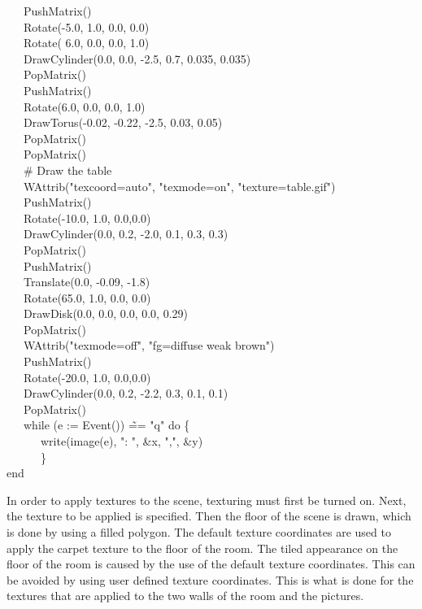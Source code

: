 \documentclass[letterpaper]{article}
\begin{document}
{{\ \ \ PushMatrix()\\
\ \ \ Rotate(-5.0, 1.0, 0.0, 0.0)\\
\ \ \ Rotate( 6.0, 0.0, 0.0, 1.0)\\
\ \ \ DrawCylinder(0.0, 0.0, -2.5, 0.7, 0.035, 0.035)\\
\ \ \ PopMatrix()\\
\ \ \ PushMatrix()\\
\ \ \ Rotate(6.0, 0.0, 0.0, 1.0)\\
\ \ \ DrawTorus(-0.02, -0.22, -2.5, 0.03, 0.05)\\
\ \ \ PopMatrix() \\
\ \ \ PopMatrix()\\
\ \ \ \# Draw the table \\
\ \ \ WAttrib("texcoord=auto", "texmode=on", "texture=table.gif")\\
\ \ \ PushMatrix()\\
\ \ \ Rotate(-10.0, 1.0, 0.0,0.0)\\
\ \ \ DrawCylinder(0.0, 0.2, -2.0, 0.1, 0.3, 0.3)\\
\ \ \ PopMatrix()\\
\ \ \ PushMatrix()\\
\ \ \ Translate(0.0, -0.09, -1.8)\\
\ \ \ Rotate(65.0, 1.0, 0.0, 0.0)\\
\ \ \ DrawDisk(0.0, 0.0, 0.0, 0.0, 0.29) \\
\ \ \ PopMatrix()\\
\ \ \ WAttrib("texmode=off", "fg=diffuse weak brown")\\
\ \ \ PushMatrix()\\
\ \ \ Rotate(-20.0, 1.0, 0.0,0.0)\\
\ \ \ DrawCylinder(0.0, 0.2, -2.2, 0.3, 0.1, 0.1)\\
\ \ \ PopMatrix()\\
\ \ \ while (e := Event()) \~== "q" do \{ \\
\ \ \ \ \ \ write(image(e), ": ", \&x, ",", \&y)\\
\ \ \ \ \ \ \}\\
end
}


\bigskip

In order to apply textures to the scene, texturing must first be
turned on. Next, the texture to be applied is specified. Then the
floor of the scene is drawn, which is done by using a filled
polygon. The default texture coordinates are used to apply the carpet
texture to the floor of the room. The tiled appearance on the floor of
the room is caused by the use of the default texture coordinates. This
can be avoided by using user defined texture coordinates. This is what
is done for the textures that are applied to the two walls of the room
and the pictures.

}
\end{document}
